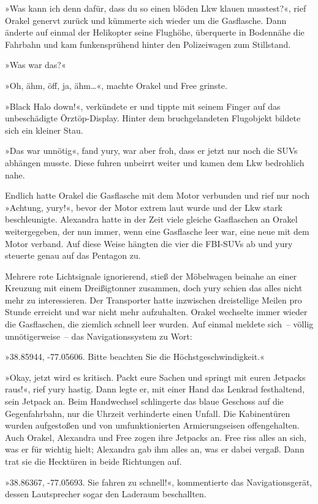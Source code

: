 »Was kann ich denn dafür, dass du so einen blöden Lkw klauen musstest?«, rief Orakel genervt zurück und kümmerte sich wieder um die Gasflasche. Dann änderte auf einmal der Helikopter seine Flughöhe, überquerte in Bodennähe die Fahrbahn und kam funkensprühend hinter den Polizeiwagen zum Stillstand.

»Was war das?«

»Oh, ähm, öff, ja, ähm…«, machte Orakel und Free grinste.

»Black Halo down!«, verkündete er und tippte mit seinem Finger auf das unbeschädigte Örztöp-Display. Hinter dem bruchgelandeten Flugobjekt bildete sich ein kleiner Stau.

»Das war unnötig«, fand yury, war aber froh, dass er jetzt nur noch die SUVs abhängen musste. Diese fuhren unbeirrt weiter und kamen dem Lkw bedrohlich nahe.

Endlich hatte Orakel die Gasflasche mit dem Motor verbunden und rief nur noch »Achtung, yury!«, bevor der Motor extrem laut wurde und der Lkw stark beschleunigte. Alexandra hatte in der Zeit viele gleiche Gasflaschen an Orakel weitergegeben, der nun immer, wenn eine Gasflasche leer war, eine neue mit dem Motor verband. Auf diese Weise hängten die vier die FBI-SUVs ab und yury steuerte genau auf das Pentagon zu.

Mehrere rote Lichtsignale ignorierend, stieß der Möbelwagen beinahe an einer Kreuzung mit einem Dreißigtonner zusammen, doch yury schien das alles nicht mehr zu interessieren. Der Transporter hatte inzwischen dreistellige Meilen pro Stunde erreicht und war nicht mehr aufzuhalten. Orakel wechselte immer wieder die Gasflaschen, die ziemlich schnell leer wurden. Auf einmal meldete sich~– völlig unnötigerweise~– das Navigationssystem zu Wort:

»38.85944, -77.05606. Bitte beachten Sie die Höchstgeschwindigkeit.«

»Okay, jetzt wird es kritisch. Packt eure Sachen und springt mit euren Jetpacks raus!«, rief yury hastig. Dann legte er, mit einer Hand das Lenkrad festhaltend, sein Jetpack an. Beim Handwechsel schlingerte das blaue Geschoss auf die Gegenfahrbahn, nur die Uhrzeit verhinderte einen Unfall. Die Kabinentüren wurden aufgestoßen und von umfunktionierten Armierungseisen offengehalten. Auch Orakel, Alexandra und Free zogen ihre Jetpacks an. Free riss alles an sich, was er für wichtig hielt; Alexandra gab ihm alles an, was er dabei vergaß. Dann trat sie die Hecktüren in beide Richtungen auf.

»38.86367, -77.05693. Sie fahren zu schnell!«, kommentierte das Navigationsgerät, dessen Lautsprecher sogar den Laderaum beschallten.

